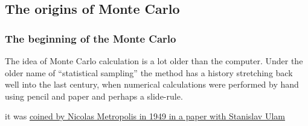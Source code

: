 \documentclass[hyperref={colorlinks=true}]{beamer}
\begin{document}
\subsection[The origins of Monte Carlo]{The origins of Monte Carlo}

\begin{frame}%
  \frametitle{The beginning of the Monte Carlo}
  
  The idea of Monte Carlo calculation is a lot older than the computer. Under the older name of ``statistical sampling'' the method has a history stretching back well into the last century, when numerical calculations were performed by hand using pencil and paper and perhaps a slide-rule.
  
  \vspace{0.3cm}
  
   it was \href{https://www.tandfonline.com/doi/abs/10.1080/01621459.1949.10483310}{coined by Nicolas Metropolis in 1949 in a paper with Stanislav Ulam}
  
  \begin{figure}
    \centering
  \end{figure}
  
\end{frame}
\end{document}
